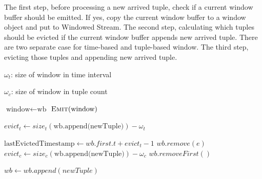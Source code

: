 \begin{algorithm}
\caption{Process new arrived tuple}
\label{algorithm:processNewTuple}
The first step, before processing a new arrived tuple, check if a current window buffer should be emitted. If yes, copy the current window buffer to a window object and put to Windowed Stream. The second step, calculating which tuples should be evicted if the current window buffer appends new arrived tuple. There are two separate case for time-based and tuple-based window. The third step, evicting those tuples and appending new arrived tuple.


\algrenewcommand{}
\algrenewcommand{}
  \begin{algorithmic}[1]
  	
  			{$\omega_t$: size of window in time interval }
  			
  			{$\omega_c$: size of window in tuple count }
    
     
    		\State $\textrm{window} \gets \textrm{wb}$
    		\State $\textsc{Emit}(\textrm{window})$ 
    \EndIf
    
    		\State $ evict_t \gets size_t (\textrm{wb.append(newTuple)}) - \omega_t$
    
    		 
    			\State $ \textrm{lastEvictedTimestamp} \gets wb.first.t + evict_t - 1$
    					\State $wb.remove(e)$
    				\EndIf
    			\EndFor
    		\EndIf
    \Else {}
    		\State $evict_c \gets size_c(\textrm{wb.append(newTuple)}) - \omega_c$
    		 
    				\State $wb.removeFirst()$
    			\EndFor
    		\EndIf
    \EndIf
    
   	\State $wb \gets wb.append(newTuple)$ 
    
    
    \EndProcedure
  \end{algorithmic}
  




\end{algorithm}


